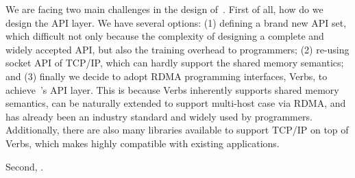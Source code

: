 We are facing two main challenges in the design of~\sysname. First of all, how do we design the API layer. We have several options: (1) defining a brand new API set, which difficult not only because the complexity of designing a complete and widely accepted API, but also the training overhead to programmers; (2) re-using socket API of TCP/IP, which can hardly support the shared memory semantics; and
(3) finally we decide to adopt RDMA programming interfaces, Verbs, to achieve~\sysname's API layer. This is because Verbs inherently supports shared memory semantics, can be naturally extended to support multi-host case via RDMA, and has already been an industry standard and widely used by programmers. Additionally, there are also many libraries available to support TCP/IP on top of Verbs, which makes \sysname highly compatible with existing applications.

Second, .